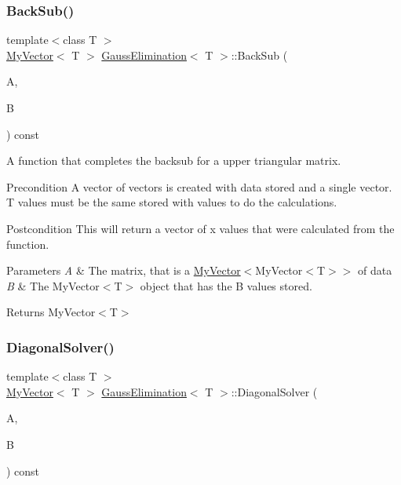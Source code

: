 \subsubsection{\texorpdfstring{BackSub()}{BackSub()}}
{\footnotesize\ttfamily template$<$class T $>$ \\
\mbox{\hyperlink{class_my_vector}{My\+Vector}}$<$ T $>$ \mbox{\hyperlink{class_gauss_elimination}{Gauss\+Elimination}}$<$ T $>$\+::Back\+Sub (\begin{DoxyParamCaption}\item[{const \mbox{\hyperlink{class_u_matrix}{U\+Matrix}}$<$ T $>$ \&}]{A,  }\item[{const \mbox{\hyperlink{class_my_vector}{My\+Vector}}$<$ T $>$ \&}]{B }\end{DoxyParamCaption}) const}



A function that completes the backsub for a upper triangular matrix. 

\begin{DoxyPrecond}{Precondition}
A vector of vectors is created with data stored and a single vector. T values must be the same stored with values to do the calculations. 
\end{DoxyPrecond}
\begin{DoxyPostcond}{Postcondition}
This will return a vector of x values that were calculated from the function.
\end{DoxyPostcond}

\begin{DoxyParams}{Parameters}
{\em A} & The matrix, that is a \mbox{\hyperlink{class_my_vector}{My\+Vector}}$<$My\+Vector$<$\+T$>$$>$ of data \\
\hline
{\em B} & The My\+Vector$<$\+T$>$ object that has the B values stored. \\
\hline
\end{DoxyParams}
\begin{DoxyReturn}{Returns}
My\+Vector$<$\+T$>$ 
\end{DoxyReturn}
\mbox{\label{class_gauss_elimination_aee32c76883aa4be9efb0480af4a09407}} 
\subsubsection{\texorpdfstring{DiagonalSolver()}{DiagonalSolver()}}
{\footnotesize\ttfamily template$<$class T $>$ \\
\mbox{\hyperlink{class_my_vector}{My\+Vector}}$<$ T $>$ \mbox{\hyperlink{class_gauss_elimination}{Gauss\+Elimination}}$<$ T $>$\+::Diagonal\+Solver (\begin{DoxyParamCaption}\item[{const \mbox{\hyperlink{class_d_matrix}{D\+Matrix}}$<$ T $>$ \&}]{A,  }\item[{const \mbox{\hyperlink{class_my_vector}{My\+Vector}}$<$ T $>$ \&}]{B }\end{DoxyParamCaption}) const}



